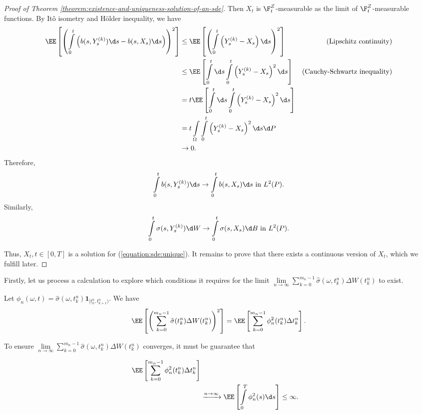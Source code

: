 \begin{proof}[Proof of Theorem \ref{theorem:existence-and-uniqueness-solution-of-an-sde}]
  Then $X_t$ is $\F_t^Z$-measurable as the limit of $\F_t^Z$-measurable functions. By Itô isometry and Hölder inequality, we have
  \begin{align*}
    \EE\left[\left(\int\limits_0^t \left(b(s,Y_s^{(k)})\d s - b(s,X_s)\d s\right)\right)^2\right]
     & \le \EE\left[\left(\int\limits_0^t \left(Y_s^{(k)}-X_s\right)\d s\right)^2\right]      & \text{(Lipschitz continuity)}       \\
     & \le \EE\left[\int\limits_0^t\d s\int\limits_0^t\left(Y_s^{(k)}-X_s\right)^2\d s\right] & \text{(Cauchy-Schwartz inequality)} \\
     & =t\EE\left[\int\limits_0^t\d s\int\limits_0^t\left(Y_s^{(k)}-X_s\right)^2\d s\right]                                         \\
     & =t \int\limits_{\Omega}\int\limits_0^t\left(Y_s^{(k)}-X_s\right)^2\d s\d P                                                   \\
     & \to 0.
  \end{align*}
  Therefore,
  $$\int\limits_0^t b(s,Y_s^{(k)})\d s\to \int\limits_0^t b(s,X_s)\d s \text{ in } L^2(P).$$
  Similarly,
  $$\int\limits_0^t \sigma(s,Y_s^{(k)})\d W\to \int\limits_0^t \sigma(s,X_s)\d B \text{ in } L^2(P).$$

  Thus, $X_t, t\in[0,T]$ is a solution for (\ref{equation:sde:unique}). It remains to prove that there exists a continuous version of $X_t$, which we fulfill later.
\end{proof}

Firstly, let us process a calculation to explore which conditions it requires for the limit $\lim\limits_{n\to\infty}\sum\limits_{k=0}^{m_n-1} \hat{\sigma}(\omega, t_k^n)\Delta W(t^n_{k})$ to exist.


\begin{proposition}
  Let $\phi_n(\omega, t) = \hat{\sigma}(\omega, t_k^n)\mathbf{1}_{[t_k^n, t_{k+1}^n)}$. We have
  $$\EE\left[\left(\sum\limits_{k=0}^{m_n-1} \hat{\sigma}(t_k^n)\Delta W(t^n_{k})\right)^2\right] = \EE\left[\sum\limits_{k=0}^{m_n-1} \phi_n^2(t_{k}^n) \Delta t_k^n\right].$$
\end{proposition}


To ensure $\lim\limits_{n\to\infty}\sum\limits_{k=0}^{m_n-1} \hat{\sigma}(\omega, t_k^n)\Delta W(t^n_{k})$ converges, it must be guarantee that

\begin{align*}
  \EE\left[\sum\limits_{k=0}^{m_n-1} \phi_n^2(t_{k}^n) \Delta t_k^n\right]                    \\
   & \xrightarrow{n\to\infty}  \EE\left[\int\limits_{0}^T \phi_n^2(s) \d s\right] \le \infty.
\end{align*}

